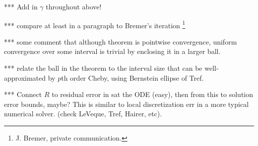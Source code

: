 \documentclass[10pt]{article}
\begin{document}
*** Add in $\gamma$ throughout above!

*** compare at least in a paragraph to Bremer's iteration
\footnote{J. Bremer, private communication.}

*** some comment that although theorem is pointwise convergence,
uniform convergence over some interval is trivial by enclosing it in
a larger ball.

*** relate the ball in the theorem to the interval size that
can be well-approximated by $p$th order Cheby,
using Bernstein ellipse of Tref.

*** Connect $R$ to residual error in sat the ODE (easy),
then from this to solution error bounds, maybe?
This is similar to local discretization err
in a more typical numerical solver.
(check LeVeque, Tref, Hairer, etc).






\end{document}
